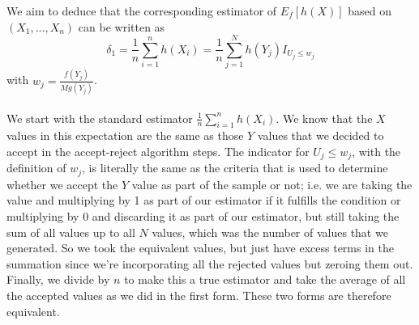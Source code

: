 \documentclass{article}
\begin{document}
{We aim to deduce that the corresponding estimator of \(E_f[h(X)]\) based on \((X_1, \dots, X_n)\) can be written as 
\[
  \delta_1 = \frac{1}{n} \sum_{i=1}^{n} h(X_i) = \frac{1}{n} \sum_{j=1}^{N} h(Y_j) I_{U_j \leq w_j}
\]
with \(w_j = \frac{f(Y_j)}{Mg(Y_j)}\). \\ \\
We start with the standard estimator \(\frac{1}{n} \sum_{i=1}^{n} h(X_i)\). We know that the \(X\) values in this expectation are the same as those \(Y\) values that we decided to accept in the accept-reject algorithm steps. The indicator for \(U_j \leq w_j\), with the definition of \(w_j\), is literally the same as the criteria that is used to determine whether we accept the \(Y\) value as part of the sample or not; i.e. we are taking the value and multiplying by 1 as part of our estimator if it fulfills the condition or multiplying by 0 and discarding it as part of our estimator, but still taking the sum of all values up to all \(N\) values, which was the number of values that we generated. So we took the equivalent values, but just have excess terms in the summation since we're incorporating all the rejected values but zeroing them out. Finally, we divide by \(n\) to make this a true estimator and take the average of all the accepted values as we did in the first form. These two forms are therefore equivalent.

}
\end{document}
